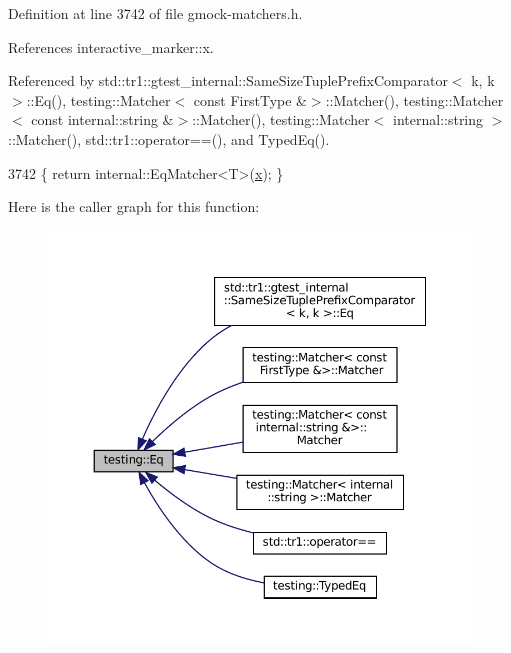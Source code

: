 Definition at line 3742 of file gmock-\/matchers.\+h.



References interactive\+\_\+marker\+::x.



Referenced by std\+::tr1\+::gtest\+\_\+internal\+::\+Same\+Size\+Tuple\+Prefix\+Comparator$<$ k, k $>$\+::\+Eq(), testing\+::\+Matcher$<$ const First\+Type \&$>$\+::\+Matcher(), testing\+::\+Matcher$<$ const internal\+::string \&$>$\+::\+Matcher(), testing\+::\+Matcher$<$ internal\+::string $>$\+::\+Matcher(), std\+::tr1\+::operator==(), and Typed\+Eq().


\begin{DoxyCode}
3742 \{ \textcolor{keywordflow}{return} internal::EqMatcher<T>(\hyperlink{namespaceinteractive__marker_acda52804aef30b460a72fb21ee01d69d}{x}); \}
\end{DoxyCode}
Here is the caller graph for this function\+:
\nopagebreak
\begin{figure}[H]
\begin{center}
\leavevmode
\includegraphics[width=350pt]{namespacetesting_a0cb8ba7eae844c871eccb29e7c81635f_icgraph}
\end{center}
\end{figure}
\mbox{\label{namespacetesting_aa7771a34f092fd6f1dca2c82fb2a36a1}} 
